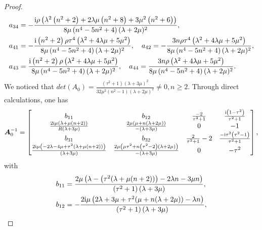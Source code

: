 \documentclass[10pt,a4paper]{amsart}
\begin{document}
\begin{proof}
\begin{align}
		a_{34}&=-\frac{\mathrm{i} \rho   \left(\lambda ^2 \left(n^2+2\right)+2 \lambda  \mu  \left(n^2+8\right)+3 \mu ^2 \left(n^2+6\right)\right)}{8 \mu  \left(n^4-5 n^2+4\right) (\lambda +2 \mu )^2},\notag\\
		a_{41}&=-\frac{\mathrm{i} \left(n^2+2\right) \rho  \tau ^4 \left(\lambda ^2+4 \lambda  \mu +5 \mu ^2\right)}{8 \mu  \left(n^4-5 n^2+4\right) (\lambda +2 \mu )^2},\quad a_{42}=-\frac{3 n \rho   \tau ^4 \left(\lambda ^2+4 \lambda  \mu +5 \mu ^2\right)}{8 \mu  \left(n^4-5 n^2+4\right) (\lambda +2 \mu )^2},\notag\\
		a_{43}&=\frac{\mathrm{i} \left(n^2+2\right) \rho   \left(\lambda ^2+4 \lambda  \mu +5 \mu ^2\right)}{8 \mu  \left(n^4-5 n^2+4\right) (\lambda +2 \mu )^2},\quad a_{44}=\frac{3 n \rho   \left(\lambda ^2+4 \lambda  \mu +5 \mu ^2\right)}{8 \mu  \left(n^4-5 n^2+4\right) (\lambda +2 \mu )^2}.\notag
	\end{align}
	\fi  
	We noticed that 
	$det\left ( A_{0}  \right ) =\frac{ \left(\tau ^2+1\right) (\lambda +3 \mu )^2}{32 \mu ^2 \left(n^2-1\right) (\lambda +2 \mu )^2}\ne0, n\ge 2 $. Through direct calculations, one has 
	\begin{align}\notag
		\bm{A}_{0}^{-1} =\begin{bmatrix}
			b_{11} & b_{12} & \frac{-2}{\tau ^2+1} & \frac{\mathrm{i} \left(1-\tau ^2\right)}{\tau ^2+1} \\
			\frac{2 \mathrm{i} \mu  (\lambda +\mu  (n+2))}{R (\lambda +3 \mu )} & \frac{2 \mu  (\mu +n (\lambda +2 \mu ))}{- (\lambda +3 \mu )} & 0 & -1 \\
			b_{31} & b_{32} & \frac{2}{\tau ^2+1}-2 & \frac{-\mathrm{i} \tau ^2 \left(\tau ^2-1\right)}{\tau ^2+1} \\
			\frac{2 \mathrm{i} \mu  \left(-2 \lambda -4 \mu +\tau ^2 (\lambda +\mu  (n+2))\right)}{ (\lambda +3 \mu )} & \frac{2 \mu  \left(\mu  \tau ^2+n \left(\tau ^2-2\right) (\lambda +2 \mu )\right)}{-(\lambda +3 \mu )} & 0 & -\tau ^2 \\
		\end{bmatrix},
	\end{align}
	with
	\begin{align}
		b_{11}&=\frac{2 \mu  \left(\lambda -\left(\tau ^2 (\lambda +\mu  (n+2))\right)-2 \lambda  n-3 \mu  n\right)}{ \left(\tau ^2+1\right) (\lambda +3 \mu )},\notag\\
		b_{12}&=-\frac{2 \mathrm{i} \mu  \left(2 \lambda +3 \mu +\tau ^2 (\mu +n (\lambda +2 \mu ))-\lambda  n\right)}{ \left(\tau ^2+1\right) (\lambda +3 \mu )},\notag\\

\end{align}
\end{proof}
\end{document}
